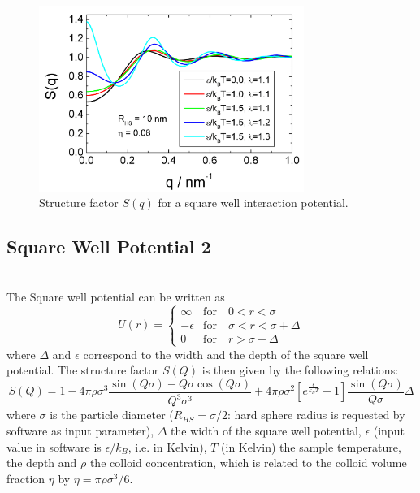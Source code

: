 \begin{figure}[htb]
\begin{center}
\includegraphics[width=0.768\textwidth]{../images/structure_factor/HardSphere/SquareWellSQ.png}
\end{center}
\caption{Structure factor $S(q)$ for a square well interaction potential.}
\label{fig:SquareWell1}
\end{figure}


\clearpage
\subsection{Square Well Potential 2} ~\\

The Square well potential can be written as
\begin{equation}
U(r) =
 \begin{cases}
      \infty    & \text{for} \quad 0<r<\sigma \\
      -\epsilon & \text{for} \quad \sigma<r<\sigma+\Delta \\
      0         & \text{for} \quad r>\sigma+\Delta
   \end{cases}
\end{equation}
where $\Delta$ and $\epsilon$ correspond to the width and the
depth of the square well potential. The structure factor $S(Q)$ is
then given by the following relations:
\begin{equation}
S(Q)  = 1
-4\pi\rho\sigma^3\frac{\sin(Q\sigma)-Q\sigma\cos(Q\sigma)}{Q^3\sigma^3}
          +4\pi\rho\sigma^2\left[e^{\frac{\epsilon}{k_BT}}-1\right]\frac{\sin(Q\sigma)}{Q\sigma}
          \Delta
\end{equation}
where $\sigma$ is the particle diameter ($R_{HS} = \sigma/2$: hard
sphere radius is requested by software as input parameter),
$\Delta$ the width of the square well potential, $\epsilon$ (input
value in software is $\epsilon/k_B$, i.e. in Kelvin), $T$ (in
Kelvin) the sample temperature, the depth and $\rho$ the colloid
concentration, which is related to the colloid volume fraction
$\eta$ by $\eta=\pi\rho\sigma^3/6$.




